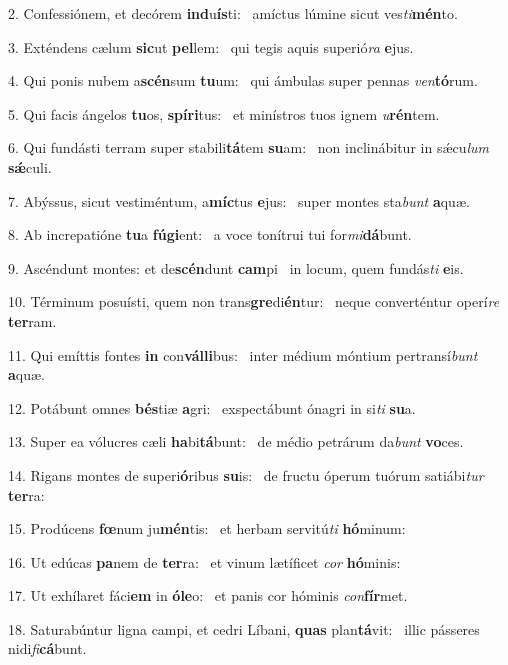2. Confessiónem, et decórem \textbf{ind}u\textbf{ís}ti: \ast\  amíctus lúmine sicut ves\textit{ti}\textbf{mén}to.\

3. Exténdens cælum \textbf{sic}ut \textbf{pel}lem: \ast\  qui tegis aquis superió\textit{ra} \textbf{e}jus.\

4. Qui ponis nubem a\textbf{scén}sum \textbf{tu}um: \ast\  qui ámbulas super pennas \textit{ven}\textbf{tó}rum.\

5. Qui facis ángelos \textbf{tu}os, \textbf{spí}\textbf{ri}tus: \ast\  et minístros tuos ignem \textit{u}\textbf{rén}tem.\

6. Qui fundásti terram super stabili\textbf{tá}tem \textbf{su}am: \ast\  non inclinábitur in sǽcu\textit{lum} \textbf{sǽ}culi.\

7. Abýssus, sicut vestiméntum, a\textbf{míc}tus \textbf{e}jus: \ast\  super montes sta\textit{bunt} \textbf{a}quæ.\

8. Ab increpatióne \textbf{tu}a \textbf{fú}\textbf{gi}ent: \ast\  a voce tonítrui tui for\textit{mi}\textbf{dá}bunt.\

9. Ascéndunt montes: et de\textbf{scén}dunt \textbf{cam}pi \ast\  in locum, quem fundás\textit{ti} \textbf{e}is.\

10. Términum posuísti, quem non trans\textbf{gre}di\textbf{én}tur: \ast\  neque converténtur operí\textit{re} \textbf{ter}ram.\

11. Qui emíttis fontes \textbf{in} con\textbf{vál}\textbf{li}bus: \ast\  inter médium móntium pertransí\textit{bunt} \textbf{a}quæ.\

12. Potábunt omnes \textbf{bés}tiæ \textbf{a}gri: \ast\  exspectábunt ónagri in si\textit{ti} \textbf{su}a.\

13. Super ea vólucres cæli \textbf{ha}bi\textbf{tá}bunt: \ast\  de médio petrárum da\textit{bunt} \textbf{vo}ces.\

14. Rigans montes de superi\textbf{ó}ribus \textbf{su}is: \ast\  de fructu óperum tuórum satiábi\textit{tur} \textbf{ter}ra:\

15. Prodúcens \textbf{fœ}num ju\textbf{mén}tis: \ast\  et herbam servitú\textit{ti} \textbf{hó}minum:\

16. Ut edúcas \textbf{pa}nem de \textbf{ter}ra: \ast\  et vinum lætíficet \textit{cor} \textbf{hó}minis:\

17. Ut exhílaret fáci\textbf{em} in \textbf{ó}\textbf{le}o: \ast\  et panis cor hóminis \textit{con}\textbf{fír}met.\

18. Saturabúntur ligna campi, et cedri Líbani, \textbf{quas} plan\textbf{tá}vit: \ast\  illic pásseres nidi\textit{fi}\textbf{cá}bunt.\

